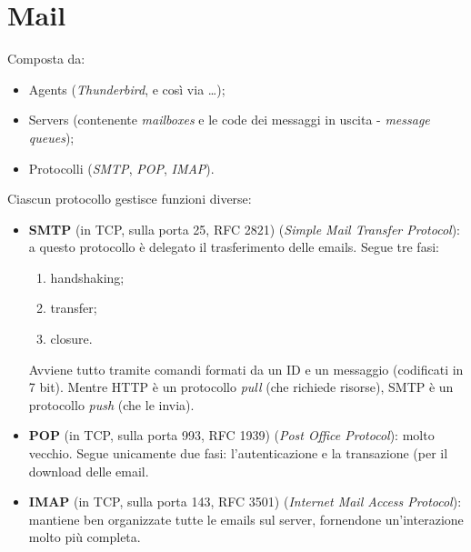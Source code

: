 \newpage

\section{Mail}
Composta da:
\begin{itemize}
    \item Agents (\textit{Thunderbird}, e così via \ldots);
    \item Servers (contenente \textit{mailboxes} e le code dei messaggi in uscita - \textit{message queues});
    \item Protocolli (\textit{SMTP}, \textit{POP}, \textit{IMAP}).
\end{itemize}
Ciascun protocollo gestisce funzioni diverse:
\begin{itemize}
    \item \textbf{SMTP} (in TCP, sulla porta 25, RFC 2821) (\textit{Simple Mail Transfer Protocol}): a questo protocollo è delegato il trasferimento delle emails. Segue tre fasi:
    \begin{enumerate}
        \item handshaking;
        \item transfer;
        \item closure.
    \end{enumerate}
    Avviene tutto tramite comandi formati da un ID e un messaggio (codificati in 7 bit). Mentre HTTP è un protocollo \textit{pull} (che richiede risorse), SMTP è un protocollo \textit{push} (che le invia).
    \item \textbf{POP} (in TCP, sulla porta 993, RFC 1939) (\textit{Post Office Protocol}): molto vecchio. Segue unicamente due fasi: l'autenticazione e la transazione (per il download delle email.
    \item \textbf{IMAP} (in TCP, sulla porta 143, RFC 3501) (\textit{Internet Mail Access Protocol}): mantiene ben organizzate tutte le emails sul server, fornendone  un'interazione molto più completa.
\end{itemize}